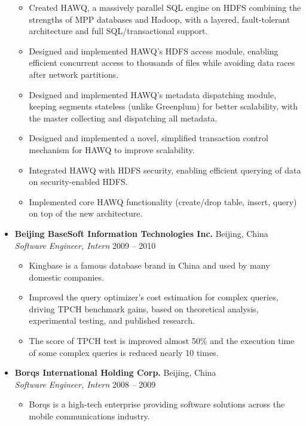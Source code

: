 \documentclass[10pt,a4paper]{article}
\newcommand{\entry}[4]{%
	\textbf{#1} \hfill {\color{subtle}#2}\\
	{\textit{#3}} \hfill {\color{subtle}\small #4}
}
\begin{document}
\begin{CJK}{UTF8}{gbsn}
\begin{itemize}
\begin{itemize}
		\item Created HAWQ, a massively parallel SQL engine on HDFS combining the strengths of MPP databases and Hadoop, with a layered, fault-tolerant architecture and full SQL/transactional support.

		\item Designed and implemented HAWQ's HDFS access module, enabling efficient concurrent access to thousands of files while avoiding data races after network partitions.

		\item Designed and implemented HAWQ's metadata dispatching module, keeping segments stateless (unlike Greenplum) for better scalability, with the master collecting and dispatching all metadata.

		\item Designed and implemented a novel, simplified transaction control mechanism for HAWQ to improve scalability.

		\item Integrated HAWQ with HDFS security, enabling efficient querying of data on security-enabled HDFS.

		\item Implemented core HAWQ functionality (create/drop table, insert, query) on top of the new architecture.
	\end{itemize}

	\item
	\entry{Beijing BaseSoft Information Technologies Inc.}{Beijing, China}
		{Software Engineer, Intern}{2009 -- 2010}
	\begin{itemize}
		\item Kingbase is a famous database brand in China and used by many domestic companies.

		\item Improved the query optimizer's cost estimation for complex queries, driving TPCH benchmark gains, based on theoretical analysis, experimental testing, and published research.

		\item The score of TPCH test is improved almost 50\% and the execution time of some complex queries is reduced nearly 10 times.
	\end{itemize}

	\item
	\entry{Borqs International Holding Corp.}{Beijing, China}
		{Software Engineer, Intern}{2008 -- 2009}
	\begin{itemize}
		\item Borqs is a high-tech enterprise providing software solutions across the mobile communications industry.


\end{itemize}
\end{itemize}
\end{CJK}
\end{document}
